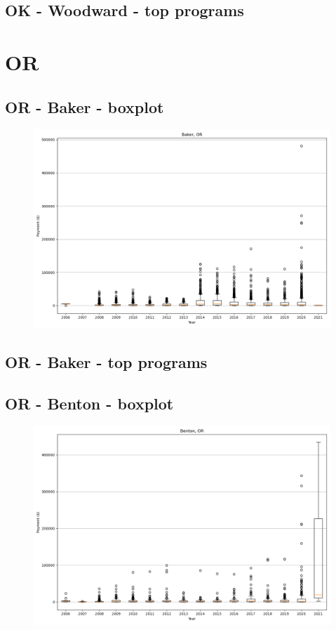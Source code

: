 \subsection*{OK - Woodward - top programs}

\newpage
\section*{OR}
\subsection*{OR - Baker - boxplot}
\begin{figure}[h]
\centering
\includegraphics[width=7in]{../output/boxplots/counties/Baker-OR_boxplot.png}
\end{figure}


\subsection*{OR - Baker - top programs}

\newpage
\subsection*{OR - Benton - boxplot}
\begin{figure}[h]
\centering
\includegraphics[width=7in]{../output/boxplots/counties/Benton-OR_boxplot.png}
\end{figure}


